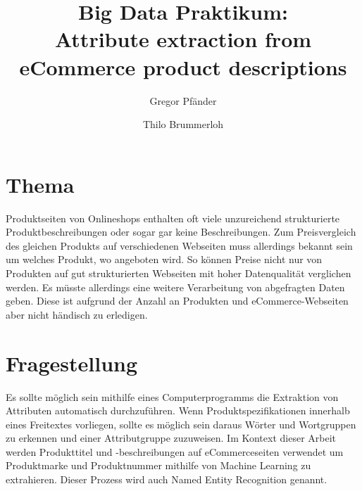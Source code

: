 \documentclass[paper=a4,12pt,listof=totoc]{scrartcl}%
\title{Big Data Praktikum: \\ Attribute extraction from eCommerce product descriptions}
\author{Gregor Pfänder 
\and Thilo Brummerloh}
\begin{document}
	\maketitle
		
	\section{Thema}
	Produktseiten von Onlineshops enthalten oft viele unzureichend strukturierte Produktbeschreibungen oder sogar gar keine Beschreibungen. Zum Preisvergleich des gleichen Produkts auf verschiedenen Webseiten muss allerdings bekannt sein um welches Produkt, wo angeboten wird. So können Preise nicht nur von Produkten auf gut strukturierten Webseiten mit hoher Datenqualität verglichen werden. Es müsste allerdings eine weitere Verarbeitung von abgefragten Daten geben. Diese ist aufgrund der Anzahl an Produkten und eCommerce-Webseiten aber nicht händisch zu erledigen.
	
	\section{Fragestellung}
	Es sollte möglich sein mithilfe eines Computerprogramms die Extraktion von Attributen automatisch durchzuführen. Wenn Produktspezifikationen innerhalb eines Freitextes vorliegen, sollte es möglich sein daraus Wörter und Wortgruppen zu erkennen und einer Attributgruppe zuzuweisen.
	Im Kontext dieser Arbeit werden Produkttitel und -beschreibungen auf eCommerceseiten verwendet um Produktmarke und Produktnummer mithilfe von Machine Learning zu extrahieren. Dieser Prozess wird auch Named Entity Recognition genannt.
	
\end{document}
